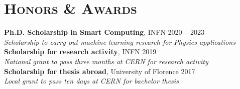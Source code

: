 \newcommand{\scholarship}[4]
  {\normalsize \textbf{\color{maincolor} #1},
  {\color{hlcolor-1} #2} \hfill {\color{hlcolor-2} #3}\\
  {\color{iconcolor} \faMedal} \emph{\color{maincolor} #4}}


\section*{\textsc{Honors \& Awards}}
\begin{cvcontent}
  \scholarship{Ph.D. Scholarship in Smart Computing}{INFN}{2020 -- 2023}{Scholarship to carry out machine learning research for Physics applications}
  \\ [3mm]
  \scholarship{Scholarship for research activity}{INFN}{2019}{National grant to pass three months at CERN for research activity}
  \\ [3mm]
  \scholarship{Scholarship for thesis abroad}{University of Florence}{2017}{Local grant to pass ten days at CERN for bachelor thesis}
\end{cvcontent}